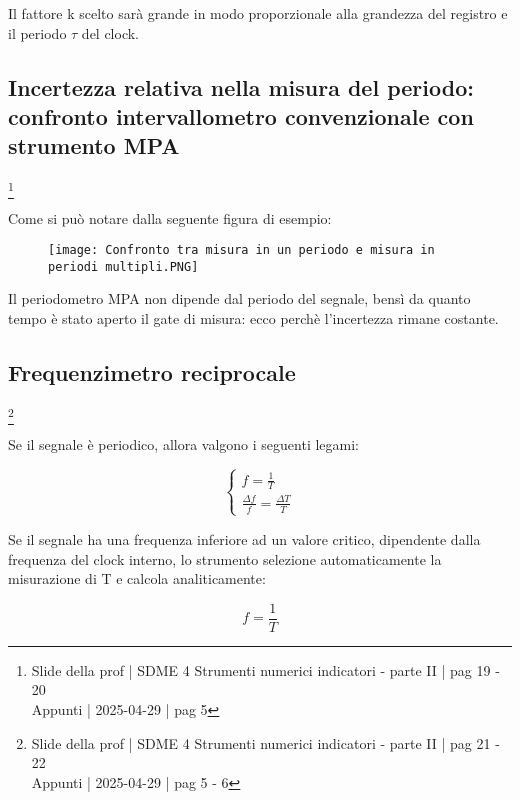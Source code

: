 Il fattore k scelto sarà grande in modo proporzionale alla grandezza del registro e il periodo $\tau$ del clock. \newline 

\newpage 

\subsection{Incertezza relativa nella misura del periodo: confronto intervallometro convenzionale con strumento MPA}
\footnote{Slide della prof | SDME 4 Strumenti numerici indicatori - parte II | pag 19 - 20 \\  
Appunti | 2025-04-29 | pag 5} 

Come si può notare dalla seguente figura di esempio: 

\begin{figure}[h]
    \centering
    \texttt{[image: Confronto tra misura in un periodo e misura in periodi multipli.PNG]}
\end{figure}

Il periodometro MPA non dipende dal periodo del segnale, bensì da quanto tempo è stato aperto il gate di misura: ecco perchè l'incertezza rimane costante. \newline 

\newpage 

\subsection{Frequenzimetro reciprocale}
\footnote{Slide della prof | SDME 4 Strumenti numerici indicatori - parte II | pag 21 - 22 \\  
Appunti | 2025-04-29 | pag 5 - 6}

Se il segnale è periodico, allora valgono i seguenti legami: 

{
    \Large 
    \begin{equation}
        \begin{cases}
            f = \frac{1}{T}
            \\ 
            \frac{\Delta f}{f} = \frac{\Delta T}{T}
        \end{cases}
    \end{equation}
}

Se il segnale ha una frequenza inferiore ad un valore critico, 
dipendente dalla frequenza del clock interno, 
lo strumento selezione automaticamente la misurazione di T e calcola analiticamente: 

{
    \Large 
    \begin{equation}
        f = \frac{1}{T}
    \end{equation}
}

